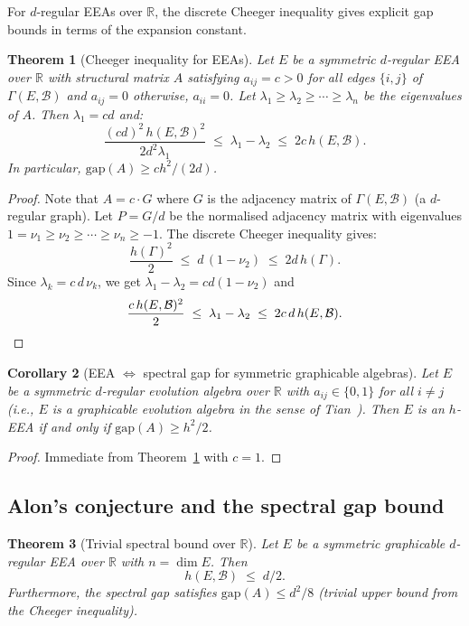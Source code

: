 \documentclass[12pt,a4paper]{amsart}
\newtheorem{theorem}{Theorem}[section]
\newtheorem{corollary}[theorem]{Corollary}
\theoremstyle{definition}
\newcommand{\R}{\mathbb{R}}
\newcommand{\hh}{h}          %
\newcommand{\EA}{E}          %
\newcommand{\natbasis}{\mathcal{B}}  %
\newcommand{\strmat}{A}      %
\begin{document}
For $d$-regular EEAs over $\R$, the discrete Cheeger inequality gives explicit gap bounds in terms of the expansion constant.

\begin{theorem}[Cheeger inequality for EEAs]\label{thm:cheeger-evop}
Let $\EA$ be a symmetric $d$-regular EEA over $\R$ with structural
matrix $\strmat$ satisfying $a_{ij}=c>0$ for all edges $\{i,j\}$ of
$\varGamma(\EA,\natbasis)$ and $a_{ij}=0$ otherwise, $a_{ii}=0$.
Let $\lambda_1\ge\lambda_2\ge\cdots\ge\lambda_n$ be the eigenvalues of
$\strmat$.  Then $\lambda_1=cd$ and:
\[
  \frac{(cd)^2\,\hh(\EA,\natbasis)^2}{2d^2\lambda_1}
  \;\le\;
  \lambda_1 - \lambda_2
  \;\le\;
  2c\,\hh(\EA,\natbasis).
\]
In particular, $\mathrm{gap}(\strmat)\ge ch^2/(2d)$.
\end{theorem}

\begin{proof}
Note that $\strmat=c\cdot G$ where $G$ is the adjacency matrix of
$\varGamma(\EA,\natbasis)$ (a $d$-regular graph).  Let $P=G/d$ be the
normalised adjacency matrix with eigenvalues $1=\nu_1\ge\nu_2\ge\cdots
\ge\nu_n\ge-1$.  The discrete Cheeger inequality
\cite[Theorem~3.3.2]{Kowalski2019} gives:
\[
  \frac{\hh(\varGamma)^2}{2} \;\le\; d\,(1-\nu_2) \;\le\; 2d\,\hh(\varGamma).
\]
Since $\lambda_k=c\,d\,\nu_k$, we get
$\lambda_1-\lambda_2=cd(1-\nu_2)$ and
\[
  \frac{c\,\hh(\EA,\natbasis)^2}{2}
  \;\le\;
  \lambda_1-\lambda_2
  \;\le\;
  2c\,d\,\hh(\EA,\natbasis).
  \qedhere
\]
\end{proof}

\begin{corollary}[EEA $\Leftrightarrow$ spectral gap for symmetric graphicable algebras]
\label{cor:spectral-EEA}
Let $\EA$ be a symmetric $d$-regular evolution algebra over $\R$ with
$a_{ij}\in\{0,1\}$ for all $i\ne j$ (i.e., $\EA$ is a
\emph{graphicable} evolution algebra in the sense of
Tian~\cite{Tian2008}).  Then $\EA$ is an $h$-EEA if and only if
$\mathrm{gap}(\strmat)\ge h^2/2$.
\end{corollary}

\begin{proof}
Immediate from Theorem~\ref{thm:cheeger-evop} with $c=1$.
\end{proof}

\subsection{Alon's conjecture and the spectral gap bound}


\begin{theorem}[Trivial spectral bound over $\R$]\label{thm:trivial-spectral}
Let $\EA$ be a symmetric graphicable $d$-regular EEA over $\R$ with
$n=\dim\EA$.  Then
\[
  \hh(\EA,\natbasis) \;\le\; d/2.
\]
Furthermore, the spectral gap satisfies
$\mathrm{gap}(\strmat)\le d^2/8$ (trivial upper bound from the
Cheeger inequality).
\end{theorem}
\end{document}
